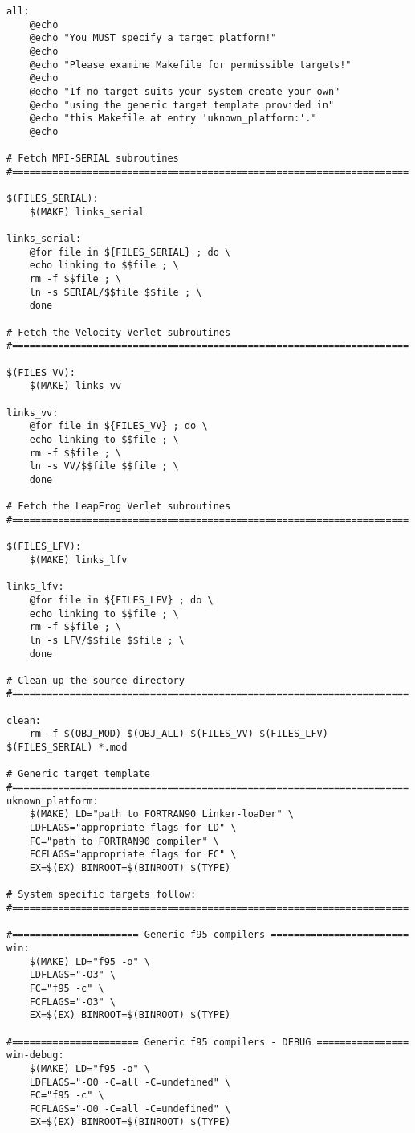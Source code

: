 \begin{verbatim}
all:
	@echo
	@echo "You MUST specify a target platform!"
	@echo
	@echo "Please examine Makefile for permissible targets!"
	@echo
	@echo "If no target suits your system create your own"
	@echo "using the generic target template provided in"
	@echo "this Makefile at entry 'uknown_platform:'."
	@echo

# Fetch MPI-SERIAL subroutines
#=====================================================================

$(FILES_SERIAL):
	$(MAKE) links_serial

links_serial:
	@for file in ${FILES_SERIAL} ; do \
	echo linking to $$file ; \
	rm -f $$file ; \
	ln -s SERIAL/$$file $$file ; \
	done

# Fetch the Velocity Verlet subroutines
#=====================================================================

$(FILES_VV):
	$(MAKE) links_vv

links_vv:
	@for file in ${FILES_VV} ; do \
	echo linking to $$file ; \
	rm -f $$file ; \
	ln -s VV/$$file $$file ; \
	done

# Fetch the LeapFrog Verlet subroutines
#=====================================================================

$(FILES_LFV):
	$(MAKE) links_lfv

links_lfv:
	@for file in ${FILES_LFV} ; do \
	echo linking to $$file ; \
	rm -f $$file ; \
	ln -s LFV/$$file $$file ; \
	done

# Clean up the source directory
#=====================================================================

clean:
	rm -f $(OBJ_MOD) $(OBJ_ALL) $(FILES_VV) $(FILES_LFV) $(FILES_SERIAL) *.mod

# Generic target template
#=====================================================================
uknown_platform:
	$(MAKE) LD="path to FORTRAN90 Linker-loaDer" \
	LDFLAGS="appropriate flags for LD" \
	FC="path to FORTRAN90 compiler" \
	FCFLAGS="appropriate flags for FC" \
	EX=$(EX) BINROOT=$(BINROOT) $(TYPE)

# System specific targets follow:
#=====================================================================

#====================== Generic f95 compilers ========================
win:
	$(MAKE) LD="f95 -o" \
	LDFLAGS="-O3" \
	FC="f95 -c" \
	FCFLAGS="-O3" \
	EX=$(EX) BINROOT=$(BINROOT) $(TYPE)

#====================== Generic f95 compilers - DEBUG ================
win-debug:
	$(MAKE) LD="f95 -o" \
	LDFLAGS="-O0 -C=all -C=undefined" \
	FC="f95 -c" \
	FCFLAGS="-O0 -C=all -C=undefined" \
	EX=$(EX) BINROOT=$(BINROOT) $(TYPE)


\end{verbatim}
